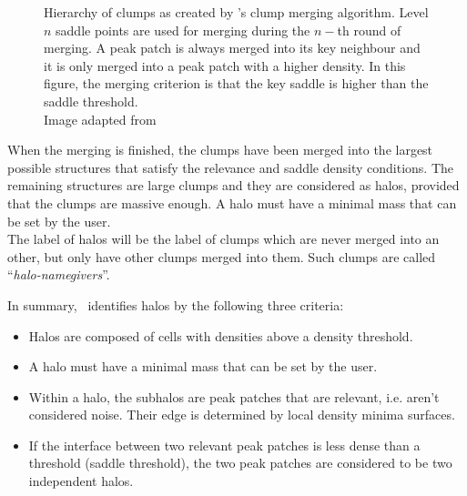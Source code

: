\begin{figure}[htbp]
\centering
	\caption{
		Hierarchy of clumps as created by \phew's clump merging algorithm. 
		Level $n$ saddle points are used for merging during the $n-$th round of merging. 
		A peak patch is always merged into its key neighbour and it is only merged into a peak patch with a higher density.
		In this figure, the merging criterion is that the key saddle is higher than the saddle threshold.\\
		Image adapted from \cite{PHEW}}
	\label{fig:phewlevels}
\end{figure}
%

When the merging is finished, the clumps have been merged into the largest possible structures that satisfy the relevance and saddle density conditions.
The remaining structures are large clumps and they are considered as halos, provided that the clumps are massive enough.
A halo must have a minimal mass that can be set by the user.\\
%
The label of halos will be the label of clumps which are never merged into an other, but only have other clumps merged into them. 
Such clumps are called ``\emph{halo-namegivers}''.



In summary, \phew\ identifies halos by the following three criteria:
\begin{itemize}
	\item {Halos are composed of cells with densities above a density threshold.}
	\item{A halo must have a minimal mass that can be set by the user.}
	\item {Within a halo, the subhalos are peak patches that are relevant, i.e. aren't considered noise. Their edge is determined by local density minima surfaces.}
	\item {If the interface between two relevant peak patches is less dense than a threshold (saddle threshold), the two peak patches are considered to be two independent halos.}
\end{itemize}





